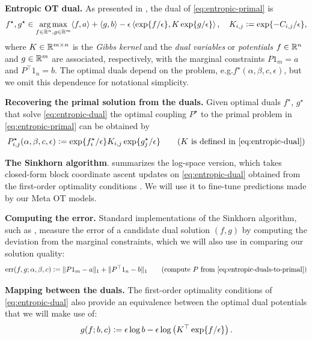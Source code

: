 \documentclass{article}
\newcommand{\eg}{e.g.\xspace}
\newcommand{\defeq}{\vcentcolon=}
\begin{document}
\textbf{Entropic OT dual.}
As presented in \citet[Prop.~4.4]{peyre2019computational},
the dual of \cref{eq:entropic-primal} is
\begin{equation}
  f^\star,g^\star\in\argmax_{f\in\R^n,g\in\R^m} \langle f, a\rangle + \langle g, b \rangle
    - \epsilon\left\langle \exp\{f/\epsilon\}, K\exp\{g/\epsilon\}\right\rangle,
  \quad
  K_{i,j}\defeq \exp\{-C_{i,j}/\epsilon\},
  \label{eq:entropic-dual}
\end{equation}
where $K\in\mathbb{R}^{m\times n}$ is the \emph{Gibbs kernel}
and the \emph{dual variables} or \emph{potentials}
$f\in\mathbb{R}^n$ and $g\in\mathbb{R}^m$ are associated, respectively, with the
marginal constraints $P1_m=a$ and $P^\top 1_n=b$.
The optimal duals depend on the problem,
\eg $f^\star(\alpha, \beta, c, \epsilon)$, but we
omit this dependence for notational simplicity.

\textbf{Recovering the primal solution from the duals.}
Given optimal duals $f^\star$, $g^\star$ that solve
\cref{eq:entropic-dual} the optimal coupling
$P^\star$ to the primal problem in \cref{eq:entropic-primal}
can be obtained by
\begin{equation}
  P_{i,j}^\star(\alpha, \beta, c, \epsilon)\defeq \exp\{f_i^\star/\epsilon\}K_{i,j}\exp\{g_j^\star/\epsilon\}
  \qquad
  (K\ {\rm is\ defined\ in\ \cref{eq:entropic-dual}})
  \label{eq:entropic-duals-to-primal}
\end{equation}

\textbf{The Sinkhorn algorithm}.
 summarizes the log-space version,
which takes closed-form block coordinate ascent updates
on \cref{eq:entropic-dual}
obtained from the first-order optimality conditions
\citep[Remark~4.21]{peyre2019computational}.
We will use it to fine-tune predictions made
by our Meta OT models.

\textbf{Computing the error.}
Standard implementations of the Sinkhorn algorithm,
such as \citet{flamary2021pot,cuturi2022optimal},
measure the error of a candidate dual solution $(f,g)$ by
computing the deviation from the marginal constraints,
which we will also use in comparing our solution quality:
\begin{equation}
  {\rm err}(f,g; \alpha, \beta, c)\defeq\|P1_m-a\|_1 + \|P^\top1_n-b\|_1
  \qquad
  {\rm (compute}\ P\ {\rm from\ \cref{eq:entropic-duals-to-primal})}
  \label{eq:sinkhorn-err}
\end{equation}

\textbf{Mapping between the duals.}
The first-order optimality conditions of \cref{eq:entropic-dual}
also provide an equivalence between the optimal dual potentials
that we will make use of:
\begin{equation}
  g(f; b, c) \defeq \epsilon \log b - \epsilon\log\left(
    K^\top \exp\{f/\epsilon\}\right).
  \label{eq:f-to-g}
\end{equation}
\end{document}
